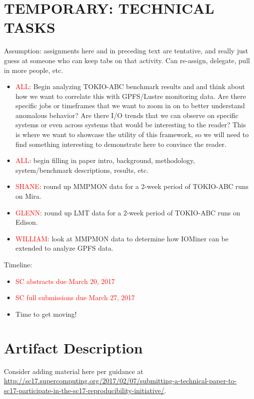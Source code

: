 \documentclass[conference,10pt,compsocconf]{IEEEtran}
\begin{document}
\section{TEMPORARY: TECHNICAL TASKS}

Assumption: assignments here and in preceding text are tentative, and really
just guess at someone who can keep tabs on that activity.  Can re-assign,
delegate, pull in more people, etc.

\begin{itemize}
    \item \textcolor{red}{ALL}: Begin analyzing TOKIO-ABC benchmark results and
    and think about how we want to correlate this with GPFS/Lustre monitoring
    data. Are there specific jobs or timeframes that we want to zoom in on
    to better understand anomalous behavior? Are there I/O trends that we
    can observe on specific systems or even across systems that would be
    interesting to the reader? This is where we want to showcase the utility
    of this framework, so we will need to find something interesting to demonstrate
    here to convince the reader. 

    \item \textcolor{red}{ALL}: begin filling in paper intro, background,
    methodology, system/benchmark descriptions, results, etc.

    \item \textcolor{red}{SHANE}: round up MMPMON data for a 2-week period
    of TOKIO-ABC runs on Mira.

    \item \textcolor{red}{GLENN}: round up LMT data for a 2-week period of
    TOKIO-ABC runs on Edison.

    \item \textcolor{red}{WILLIAM}: look at MMPMON data to determine how
    IOMiner can be extended to analyze GPFS data. 
\end{itemize}

Timeline:
\begin{itemize}
    \item \textcolor{red}{SC abstracts due March 20, 2017}
    \item \textcolor{red}{SC full submissions due March 27, 2017}
    \item Time to get moving!
\end{itemize}




\appendix

\section{Artifact Description}

Consider adding material here per guidance at
\url{http://sc17.supercomputing.org/2017/02/07/submitting-a-technical-paper-to-sc17-participate-in-the-sc17-reproducibility-initiative/}.
\end{document}
